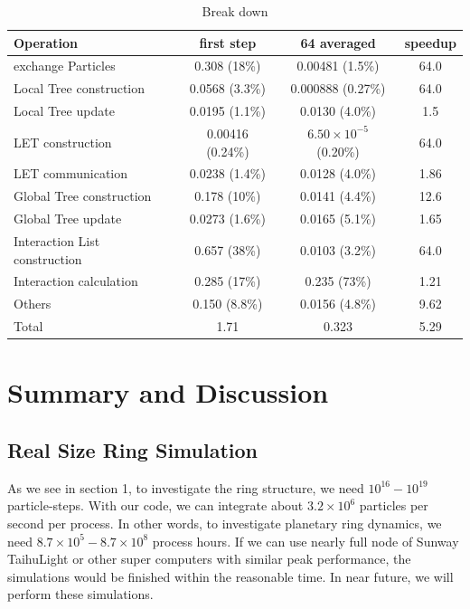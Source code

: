 \documentclass[]{pasj01}
\begin{document}
\begin{table}
  \caption{Break down}
  \label{tab:break_down}
  \begin{tabular}{lccc}
    \toprule
    Operation & first step & 64 averaged & speedup\\
    \midrule
    exchange Particles            & 0.308   (18\%)   & 0.00481  (1.5\%)  & 64.0 \\
    Local Tree construction       & 0.0568  (3.3\%)  & 0.000888 (0.27\%) & 64.0 \\
    Local Tree update             & 0.0195  (1.1\%)  & 0.0130   (4.0\%)   & 1.5 \\
    LET construction              & 0.00416 (0.24\%) &  $6.50 \times 10^{-5}$ (0.20\%) & 64.0 \\
    LET communication             & 0.0238  (1.4\%)  & 0.0128  (4.0\%) & 1.86 \\
    Global Tree construction      & 0.178   (10\%)   & 0.0141  (4.4\%) & 12.6 \\
    Global Tree update            & 0.0273  (1.6\%)  & 0.0165  (5.1\%) & 1.65 \\
    Interaction List construction & 0.657   (38\%)   & 0.0103  (3.2\%) & 64.0 \\
    Interaction calculation       & 0.285   (17\%)   & 0.235   (73\%)  & 1.21 \\
    Others                        & 0.150   (8.8\%)  & 0.0156  (4.8\%) & 9.62 \\
    \midrule
    Total                         & 1.71   & 0.323     & 5.29 \\
  \bottomrule
  \end{tabular}
\end{table}

\section{Summary and Discussion}
\label{sec:summary}

\subsection{Real Size Ring Simulation}

As we see in section 1, to investigate the ring structure, we need
$10^{16}-10^{19}$ particle-steps. With our code, we can integrate
about $3.2 \times 10^6$ particles per second per process. In other
words, to investigate planetary ring dynamics, we need $8.7 \times
10^5 - 8.7 \times 10^8$ process hours. If we can use nearly full node
of Sunway TaihuLight or other super computers with similar peak
performance, the simulations would be finished within the reasonable
time. In near future, we will perform these simulations.
\end{document}
